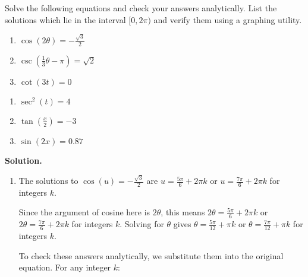 \documentclass{ximera}
\begin{document}
\begin{example}  \label{TrigEqnEx1} Solve the following equations and check your answers analytically.  List the solutions which lie in the interval $[0,2\pi)$ and verify them using a graphing utility.


\begin{multicols}{3}

\begin{enumerate}

\item  $\cos(2\theta) = -\frac{\sqrt{3}}{2}$
\item  $\csc\left(\frac{1}{3}\theta-\pi \right) = \sqrt{2}$
\item  $\cot\left(3t \right) = 0$

\setcounter{HW}{\value{enumi}}

\end{enumerate}

\end{multicols}

\begin{multicols}{3} 

\begin{enumerate}

\setcounter{enumi}{\value{HW}}

\item  $\sec^{2}(t) = 4$
\item  \label{arctanin02pi} $\tan\left(\frac{x}{2}\right) = -3$
\item  $\sin(2x) = 0.87$

\end{enumerate}

\end{multicols}

{\bf Solution.}

\begin{enumerate}

\item  The solutions to $\cos(u) =-\frac{\sqrt{3}}{2}$ are $u = \frac{5\pi}{6} + 2\pi k$ or $u = \frac{7\pi}{6} + 2\pi k$ for integers $k$.  

\smallskip

Since the argument of cosine here is $2\theta$, this means $2\theta = \frac{5\pi}{6} + 2\pi k$ or $2\theta = \frac{7\pi}{6} + 2\pi k$ for integers $k$.  Solving for $\theta$ gives $\theta = \frac{5\pi}{12} + \pi k$ or $\theta = \frac{7\pi}{12} + \pi k$ for integers $k$. 

\smallskip

 To check these answers analytically, we substitute them into the original equation.  For any integer $k$:


\end{enumerate}
\end{example}
\end{document}
